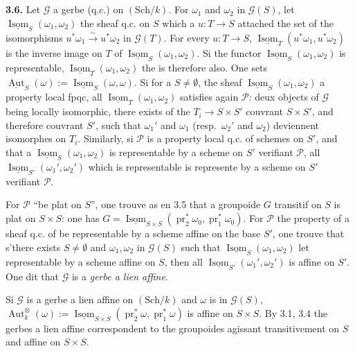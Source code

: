 \documentclass[12pt,a4paper]{article}
\theoremstyle{plain}
\theoremstyle{definition}
\theoremstyle{remark}
\DeclareMathOperator{\Aut}{Aut}
\DeclareMathOperator{\Isom}{Isom}
\DeclareMathOperator{\pr}{pr}
\begin{document}
\subsection{}

\textbf{3.6.} Let $\mathcal{G}$ a gerbe (q.c.) on $(\mathrm{Sch}/k)$. For $\omega_1$ and $\omega_2$ in $\mathcal{G}(S)$, let $\underline{\Isom}_S(\omega_1,\omega_2)$ the sheaf q.c. on $S$ which a $u : T \to S$ attached the set of the isomorphisms $u^*\omega_1 \xrightarrow{\sim} u^*\omega_2$ in $\mathcal{G}(T)$. For every $u : T \to S$, $\underline{\Isom}_T(u^*\omega_1, u^*\omega_2)$ is the inverse image on $T$ of $\underline{\Isom}_S(\omega_1,\omega_2)$. Si the functor $\underline{\Isom}_S(\omega_1,\omega_2)$ is representable, $\underline{\Isom}_T(\omega_1,\omega_2)$ the is therefore also. One sets $\underline{\Aut}_S(\omega) := \underline{\Isom}_S(\omega,\omega)$. Si for a $S \neq \emptyset$, the sheaf $\underline{\Isom}_S(\omega_1,\omega_2)$ a property local fpqc, all $\underline{\Isom}_T(\omega_1,\omega_2)$ satisfies again $\mathcal{P}$: deux objects of $\mathcal{G}$ being locally isomorphic, there exists of the $T_i \to S \times S'$ couvrant $S \times S'$, and therefore couvrant $S'$, such that $\omega_1'$ and $\omega_1$ (resp.~$\omega_2'$ and $\omega_2$) deviennent isomorphes on $T_i$. Similarly, si $\mathcal{P}$ is a property local q.c. of schemes on $S'$, and that a $\underline{\Isom}_S(\omega_1,\omega_2)$ is representable by a scheme on $S'$ verifiant $\mathcal{P}$, all $\underline{\Isom}_{S'}(\omega_1',\omega_2')$ which is representable is represente by a scheme on $S'$ verifiant $\mathcal{P}$.

For $\mathcal{P}$ ``be plat on $S$'', one trouve as en 3.5 that a groupoide $G$ transitif on $S$ is plat on $S \times S$: one has $G = \underline{\Isom}_{S \times S}(\pr_2^*\omega_0, \pr_1^*\omega_0)$. For $\mathcal{P}$ the property of a sheaf q.c. of be representable by a scheme affine on the base $S'$, one trouve that s'there exists $S \neq \emptyset$ and $\omega_1, \omega_2$ in $\mathcal{G}(S)$ such that $\underline{\Isom}_S(\omega_1,\omega_2)$ let representable by a scheme affine on $S$, then all $\underline{\Isom}_{S'}(\omega_1',\omega_2')$ is affine on $S'$. One dit that $\mathcal{G}$ is a \emph{gerbe a lien affine}.

Si $\mathcal{G}$ is a gerbe a lien affine on $(\mathrm{Sch}/k)$ and $\omega$ is in $\mathcal{G}(S)$, $\Aut^\otimes_k(\omega) := \underline{\Isom}_{S \times S}(\pr_2^*\omega, \pr_1^*\omega)$ is affine on $S \times S$. By 3.1, 3.4 the gerbes a lien affine correspondent to the groupoides agissant transitivement on $S$ and affine on $S \times S$.
\end{document}
